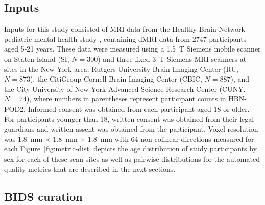 \documentclass[fleqn,10pt,inline]{wlscirep}
\begin{document}
\subsection*{Inputs}

Inputs for this study consisted of MRI data from  the Healthy Brain Network
pediatric mental health study , containing dMRI data from
\num{2747} participants aged 5-21 years.
These data were measured using a \qty{1.5}{\tesla} Siemens mobile scanner on Staten Island (SI, $N=300$) and three fixed
\qty{3}{\tesla} Siemens MRI scanners at sites in the New York area: Rutgers
University Brain Imaging Center (RU, $N=873$), the CitiGroup Cornell Brain Imaging
Center (CBIC, $N=887$), and the City University of New York Advanced Science Research
Center (CUNY, $N=74$), where numbers in parentheses represent participant counts in HBN-POD2.
Informed consent was obtained from each participant aged 18 or
older. For participants younger than 18, written consent was obtained from their
legal guardians and written assent was obtained from the participant.
Voxel resolution was \qty{1.8}{\mm} $\times$ \qty{1.8}{\mm} $\times$ \qty{1.8}{\mm} with \num{64} non-colinear
directions measured for each 
Figure~\ref{fig:metric-dist} depicts the age distribution of study participants by sex for each of these scan sites as well as pairwise distributions for the automated quality metrics that are described in the next sections.

\subsection*{BIDS curation}
\end{document}
